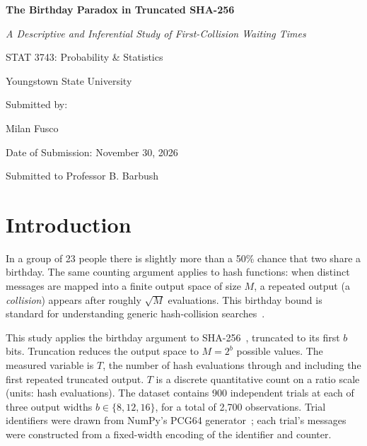 \documentclass[12pt,letterpaper]{article}
\begin{document}
\begin{titlepage}
\centering
\vspace*{2cm}
{\LARGE\bfseries The Birthday Paradox in Truncated SHA-256\par}
\vspace{0.4cm}
{\Large\itshape A Descriptive and Inferential Study of First-Collision Waiting Times\par}
\vspace{2cm}
{\large STAT 3743: Probability \& Statistics\par}
{\large Youngstown State University\par}
\vspace{1.5cm}
{\large Submitted by:\par}
{\large Milan Fusco\par}
\vspace{1cm}
{\large Date of Submission: November 30, 2026\par}
\vspace{1.5cm}
{\large Submitted to Professor B. Barbush\par}
\vfill
\end{titlepage}

\setcounter{page}{1}


\section{Introduction}

In a group of 23 people there is slightly more than a 50\% chance that two share a birthday. The same counting argument applies to hash functions: when distinct messages are mapped into a finite output space of size $M$, a repeated output (a \emph{collision}) appears after roughly $\sqrt{M}$ evaluations. This birthday bound is standard for understanding generic hash-collision searches~\cite{paar2024}.

This study applies the birthday argument to SHA-256~\cite{fips1804}, truncated to its first $b$ bits. Truncation reduces the output space to $M = 2^b$ possible values. The measured variable is $T$, the number of hash evaluations through and including the first repeated truncated output. $T$ is a discrete quantitative count on a ratio scale (units: hash evaluations). The dataset contains 900 independent trials at each of three output widths $b \in \{8, 12, 16\}$, for a total of 2{,}700 observations. Trial identifiers were drawn from NumPy's PCG64 generator~\cite{numpyPCG64}; each trial's messages were constructed from a fixed-width encoding of the identifier and counter.
\end{document}
